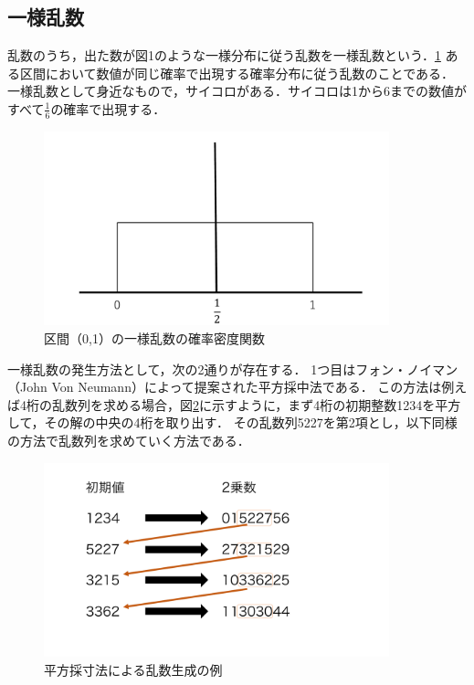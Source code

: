 \documentclass[12pt,a4j]{ltjsarticle}
\begin{document}
\subsection{一様乱数}
乱数のうち，出た数が図1のような一様分布に従う乱数を一様乱数という．\ref{fig:itiyou}
ある区間において数値が同じ確率で出現する確率分布に従う乱数のことである．
一様乱数として身近なもので，サイコロがある．サイコロは1から6までの数値がすべて$\frac{1}{6}$の確率で出現する．
\begin{figure}[h]
\begin{center}
\includegraphics[width = 100mm ] {figures/itiyou.pdf}
\caption{区間（0,1）の一様乱数の確率密度関数}
\end{center}
\label{fig:itiyou}
\end{figure}
\clearpage

一様乱数の発生方法として，次の2通りが存在する．
1つ目はフォン・ノイマン（John Von Neumann）によって提案された平方採中法である．
この方法は例えば4桁の乱数列を求める場合，図\ref{fig:heihou}に示すように，まず4桁の初期整数1234を平方して，その解の中央の4桁を取り出す．
その乱数列5227を第2項とし，以下同様の方法で乱数列を求めていく方法である．
\begin{figure}[h]
\begin{center}
\includegraphics[width = 100mm ] {figures/heihousaisunhou.pdf}
\caption{平方採寸法による乱数生成の例} 
\end{center}
\label{fig:heihou}
\end{figure}
\end{document}
